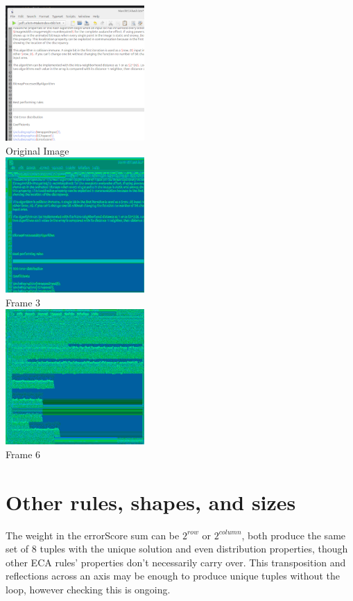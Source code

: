 \documentclass[11pt]{article}
\begin{document}
\begin{center}
\includegraphics{testScreenshot}\\
Original Image\\
\includegraphics{processedDepth3}\\
Frame 3\\
\includegraphics{processedDepth6}\\
Frame 6\\
\end{center}

\section{Other rules, shapes, and sizes}

The weight in the errorScore sum can be $2^{row}$ or $2^{column}$, both produce the same set of 8 tuples with the unique solution and even distribution properties, though other ECA rules' properties don't necessarily carry over. This transposition and reflections across an axis may be enough to produce unique tuples without the loop, however checking this is ongoing.\\
\end{document}

